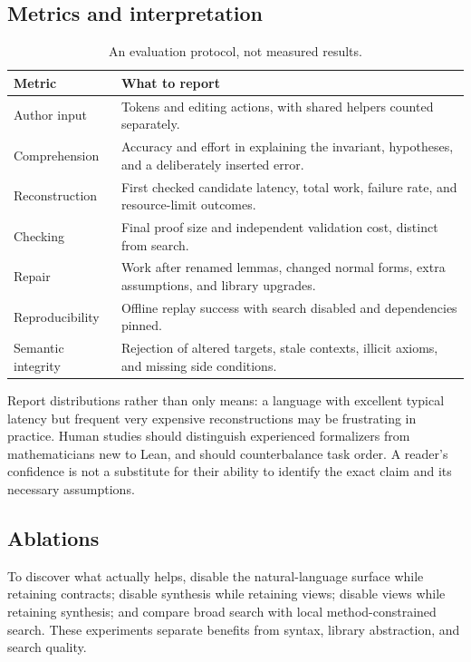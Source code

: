 \documentclass[11pt,a4paper]{article}
\theoremstyle{remark}
\begin{document}
\subsection{Metrics and interpretation}

\begin{table}[htbp]
\centering\small
\begin{tabularx}{\textwidth}{@{}p{}X@{}}
\toprule
Metric & What to report \\
\midrule
Author input & Tokens and editing actions, with shared helpers counted separately. \\
Comprehension & Accuracy and effort in explaining the invariant, hypotheses, and a deliberately inserted error. \\
Reconstruction & First checked candidate latency, total work, failure rate, and resource-limit outcomes. \\
Checking & Final proof size and independent validation cost, distinct from search. \\
Repair & Work after renamed lemmas, changed normal forms, extra assumptions, and library upgrades. \\
Reproducibility & Offline replay success with search disabled and dependencies pinned. \\
Semantic integrity & Rejection of altered targets, stale contexts, illicit axioms, and missing side conditions. \\
\bottomrule
\end{tabularx}
\caption{An evaluation protocol, not measured results.}
\end{table}

Report distributions rather than only means: a language with excellent typical latency but frequent very expensive reconstructions may be frustrating in practice. Human studies should distinguish experienced formalizers from mathematicians new to Lean, and should counterbalance task order. A reader's confidence is not a substitute for their ability to identify the exact claim and its necessary assumptions.

\subsection{Ablations}

To discover what actually helps, disable the natural-language surface while retaining contracts; disable synthesis while retaining views; disable views while retaining synthesis; and compare broad search with local method-constrained search. These experiments separate benefits from syntax, library abstraction, and search quality.
\end{document}
